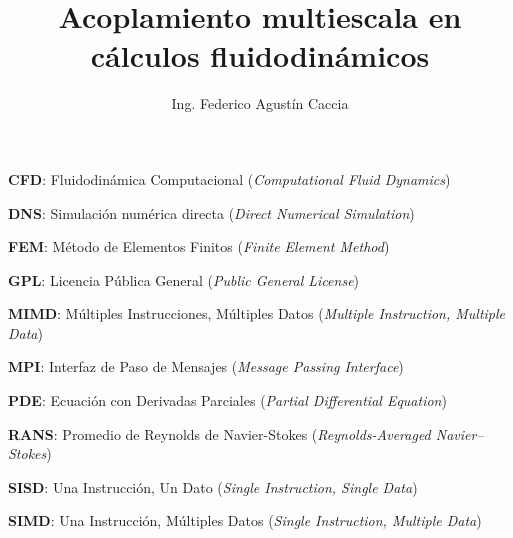 \documentclass[12pt,screen,twoside,pagebackref]{ibtesis}
\title{Acoplamiento multiescala en cálculos fluidodinámicos}
\author{Ing. Federico Agustín Caccia}
\begin{document}
\renewcommand{\tablename}{Tabla} %


\begin{preliminary}



\begin{abreviaturas} %

\textbf{CFD}: Fluidodinámica Computacional (\textit{Computational Fluid Dynamics})

\textbf{DNS}: Simulación numérica directa (\textit{Direct Numerical Simulation})

\textbf{FEM}: Método de Elementos Finitos (\textit{Finite Element Method})

\textbf{GPL}: Licencia Pública General (\textit{Public General License})

\textbf{MIMD}: Múltiples Instrucciones, Múltiples Datos (\textit{Multiple Instruction, Multiple Data})

\textbf{MPI}: Interfaz de Paso de Mensajes (\textit{Message Passing Interface})

\textbf{PDE}: Ecuación con Derivadas Parciales (\textit{Partial Differential Equation})

\textbf{RANS}: Promedio de Reynolds de Navier-Stokes (\textit{Reynolds-Averaged Navier–Stokes})

\textbf{SISD}: Una Instrucción, Un Dato (\textit{Single Instruction, Single Data})

\textbf{SIMD}: Una Instrucción, Múltiples Datos (\textit{Single Instruction, Multiple Data})

\end{abreviaturas}

\tableofcontents                %

\listoffigures                  %

\listoftables                   %



\end{preliminary}


%
\end{document}
